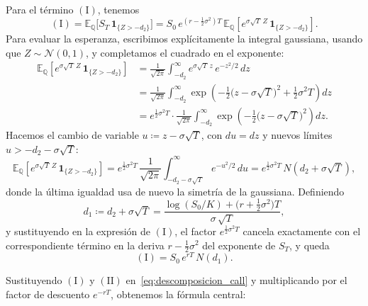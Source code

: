 \documentclass[11pt,a4paper,oneside]{report}
\theoremstyle{plain}
\theoremstyle{definition}
\theoremstyle{remark}
\newcommand{\E}{\mathbb{E}}
\newcommand{\Q}{\mathbb{Q}}
\newcommand{\1}{\mathbf{1}}
\newcommand{\eqdef}{\coloneqq}
\begin{document}
Para el término $(\mathrm{I})$, tenemos
\begin{equation*}
  (\mathrm{I}) = \E_\Q\bigl[S_T\, \mathbf{1}_{\{Z > -d_2\}}\bigr]
              = S_0\, e^{(r - \frac{1}{2}\sigma^2) T}\,
                \E_\Q\!\left[e^{\sigma\sqrt{T}\, Z}\,
                              \mathbf{1}_{\{Z > -d_2\}}\right].
\end{equation*}
Para evaluar la esperanza, escribimos explícitamente la integral
gaussiana, usando que $Z \sim \mathcal{N}(0, 1)$, y completamos el
cuadrado en el exponente:
\begin{align*}
  \E_\Q\!\left[e^{\sigma\sqrt{T}\, Z}\, \mathbf{1}_{\{Z > -d_2\}}\right]
  &= \frac{1}{\sqrt{2\pi}} \int_{-d_2}^{\infty}
       e^{\sigma\sqrt{T}\, z}\, e^{-z^2/2}\, dz \\
  &= \frac{1}{\sqrt{2\pi}} \int_{-d_2}^{\infty}
       \exp\!\left(-\tfrac{1}{2}\bigl(z - \sigma\sqrt{T}\bigr)^2
                   + \tfrac{1}{2}\sigma^2 T\right) dz \\
  &= e^{\frac{1}{2}\sigma^2 T} \cdot
     \frac{1}{\sqrt{2\pi}} \int_{-d_2}^{\infty}
       \exp\!\left(-\tfrac{1}{2}\bigl(z - \sigma\sqrt{T}\bigr)^2\right) dz.
\end{align*}
Hacemos el cambio de variable $u \eqdef z - \sigma\sqrt{T}$, con $du =
dz$ y nuevos límites $u > -d_2 - \sigma\sqrt{T}$:
\begin{equation*}
  \E_\Q\!\left[e^{\sigma\sqrt{T}\, Z}\, \mathbf{1}_{\{Z > -d_2\}}\right]
  = e^{\frac{1}{2}\sigma^2 T}\,
    \frac{1}{\sqrt{2\pi}} \int_{-d_2 - \sigma\sqrt{T}}^{\infty}
       e^{-u^2/2}\, du
  = e^{\frac{1}{2}\sigma^2 T}\, N(d_2 + \sigma\sqrt{T}),
\end{equation*}
donde la última igualdad usa de nuevo la simetría de la gaussiana.
Definiendo
\begin{equation}\label{eq:def_d1}
  d_1 \eqdef d_2 + \sigma\sqrt{T}
       = \frac{\log(S_0/K) + \bigl(r + \tfrac{1}{2}\sigma^2\bigr) T}
              {\sigma\, \sqrt{T}},
\end{equation}
y sustituyendo en la expresión de $(\mathrm{I})$, el factor
$e^{\frac{1}{2}\sigma^2 T}$ cancela exactamente con el correspondiente término en la
deriva $r - \tfrac{1}{2}\sigma^2$ del exponente de $S_T$, y queda
\begin{equation}\label{eq:termino_I}
  (\mathrm{I}) = S_0\, e^{rT}\, N(d_1).
\end{equation}

Sustituyendo
$(\mathrm{I})$ y $(\mathrm{II})$ en~\eqref{eq:descomposicion_call} y
multiplicando por el factor de descuento $e^{-rT}$, obtenemos la
fórmula central:
\end{document}
